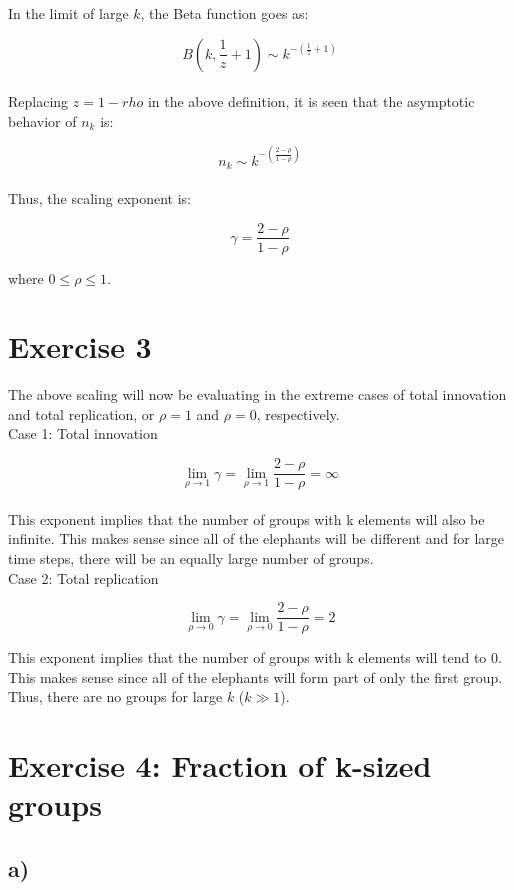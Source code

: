 \documentclass{article}
\begin{document}
In the limit of large $k$, the Beta function goes as:

\[ B(k,\frac{1}{z}+1)  \sim k^{-(\frac{1}{z}+1)}\] \\

Replacing $z = 1-rho$ in the above definition, it is seen that the asymptotic behavior of $n_k$ is:

\[ n_k \sim k^{-(\frac{2-\rho}{1-\rho})}\] \\

Thus, the scaling exponent is:

\[ \gamma = \frac{2-\rho}{1-\rho} \]

where $0 \leq \rho \leq 1$.

\section{Exercise 3}

The above scaling will now be evaluating in the extreme cases of total innovation and total replication, or $\rho = 1$ and $\rho = 0$, respectively. \\

Case 1: Total innovation

\[ \lim_{\rho\to1} \gamma = \lim_{\rho\to1} \frac{2-\rho}{1-\rho} = \infty \] \\

This exponent implies that the number of groups with k elements will also be infinite. This makes sense since all of the elephants will be different and for large time steps, there will be an equally large number of groups. \\

Case 2: Total replication

\[ \lim_{\rho\to0} \gamma = \lim_{\rho\to0} \frac{2-\rho}{1-\rho} = 2 \]

This exponent implies that the number of groups with k elements will tend to 0. This makes sense since all of the elephants will form part of only the first group. Thus, there are no groups for large $k$ ($k\gg1$).

\section{Exercise 4: Fraction of k-sized groups}

\subsection{a)}
\end{document}
